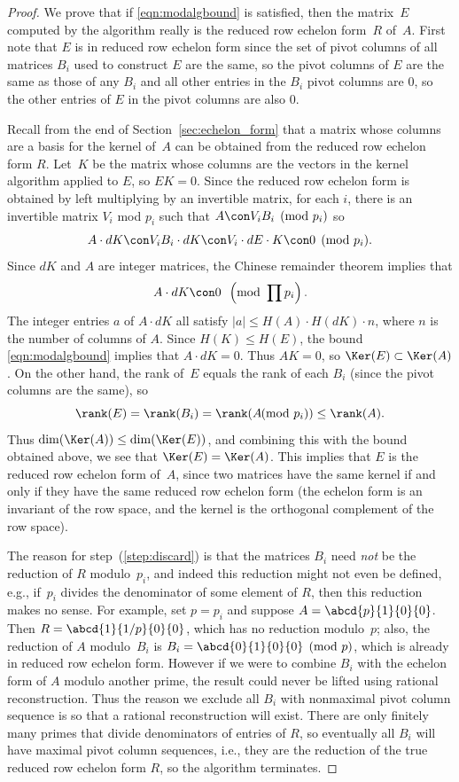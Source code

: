 \begin{proof}
  We prove that if \eqref{eqn:modalgbound} is satisfied, then the
  matrix~$E$ computed by the algorithm really is the reduced row
  echelon form~$R$ of~$A$.  First note that $E$ is in reduced row
  echelon form since the set of pivot columns of all matrices $B_i$
  used to construct $E$ are the same, so the pivot columns of $E$ are
  the same as those of any $B_i$ and all other entries in the $B_i$
  pivot columns are $0$, so the other entries of $E$ in the pivot
  columns are also $0$.

  Recall from the end of Section~\ref{sec:echelon_form} that a matrix
  whose columns are a basis for the kernel of~$A$ can be obtained from
  the reduced row echelon form $R$.  Let~$K$ be the matrix whose
  columns are the vectors in the kernel algorithm applied to $E$, 
so $EK=0$.  Since the reduced row echelon form is obtained by left
multiplying by an invertible matrix, for each $i$, there is 
an invertible matrix $V_i$ mod $p_i$ such that $A \con V_i B_i\pmod{p_i}$
so
$$
  A\cdot d K \con V_i B_i \cdot d K \con V_i \cdot dE \cdot K \con 0\pmod{p_i}.
$$
Since $d K$ and $A$ are integer matrices, the Chinese
remainder theorem implies that
$$
 A \cdot dK \con 0\,\,\,\left(\text{mod } \prod{p_i}\right).
$$
The integer entries $a$ of $A\cdot dK$ all satisfy
 $|a| \leq H(A)\cdot{} H(dK)\cdot{} n$,
where $n$ is the number of columns of $A$.  Since $H(K) \leq H(E)$,
the bound \eqref{eqn:modalgbound} implies that $A \cdot dK = 0$.  Thus
$A K = 0$, so $\Ker(E) \subset \Ker(A)$.  On the other hand,
the rank of~$E$ equals the rank of each $B_i$ (since the pivot columns
are the same), so $$\rank(E) = \rank(B_i) = \rank(A\!\!\!\pmod{p_i}) \leq
\rank(A).$$  Thus $\dim(\Ker(A)) \leq \dim(\Ker(E))$, and combining
this with the bound obtained above, we see that 
$\Ker(E) = \Ker(A)$.   This implies that $E$ is the reduced row
echelon form of~$A$, since two matrices have the same kernel if
and only if they have the same reduced row echelon form 
(the echelon form is an invariant of the row space, and the
kernel is the orthogonal complement of the row space).

The reason for step~(\ref{step:discard}) is that the matrices $B_i$ need
{\em not} be the reduction of $R$ modulo~$p_i$, and indeed this
reduction might not even be defined, e.g., if~$p_i$ divides the
denominator of some element of $R$, then this reduction makes no
sense.  For example, set $p=p_i$ and suppose $A=\abcd{p}{1}{0}{0}$.
Then $R=\abcd{1}{1/p}{0}{0}$, which has no reduction modulo~$p$; also,
the reduction of $A$ modulo~$B_i$ is $B_i = \abcd{0}{1}{0}{0}
\pmod{p}$, which is already in reduced row echelon form.  However if
we were to combine $B_i$ with the echelon form of $A$ modulo another
prime, the result could never be lifted using rational reconstruction.
Thus the reason we exclude all $B_i$ with nonmaximal pivot column
sequence is so that a rational reconstruction will exist.  There are
only finitely many primes that divide denominators of entries of $R$,
so eventually all $B_i$ will have maximal pivot column sequences,
i.e., they are the reduction of the true reduced row echelon form $R$, so
the algorithm terminates.
\end{proof}


